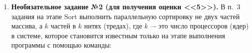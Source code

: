 \begin{enumerate}
    \item\textbf{Необязательное задание №2 (для получения оценки <<5>>).} В п.~3 задания на этапе Sort выполнить параллельную сортировку не двух частей массива, а $k$ частей в $k$ нитях (тредах), где $k$ –- это число процессоров (ядер) в системе, которое становится известным только на этапе выполнения программы с помощью команды:
\end{enumerate}
